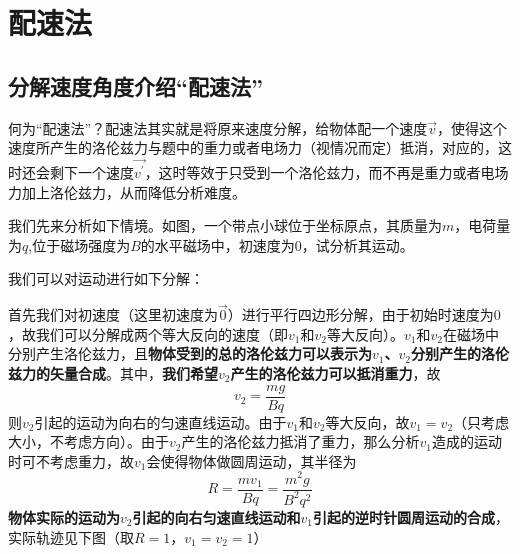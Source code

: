 \section{配速法}

\subsection{分解速度角度介绍“配速法”}

何为“配速法”？配速法其实就是将原来速度分解，给物体配一个速度$\vec{v}$，使得这个速度所产生的洛伦兹力与题中的重力或者电场力（视情况而定）抵消，对应的，这时还会剩下一个速度$\vec{v^{\prime}}$，这时等效于只受到一个洛伦兹力，而不再是重力或者电场力加上洛伦兹力，从而降低分析难度。



我们先来分析如下情境。如图，一个带点小球位于坐标原点，其质量为$m$，电荷量为$q$,位于磁场强度为$B$的水平磁场中，初速度为$0$，试分析其运动。

我们可以对运动进行如下分解：



首先我们对初速度（这里初速度为$\vec{0}$）进行平行四边形分解，由于初始时速度为$0$，故我们可以分解成两个等大反向的速度（即$v_1$和$v_2$等大反向）。$v_1$和$v_2$在磁场中分别产生洛伦兹力，且\textbf{物体受到的总的洛伦兹力可以表示为$v_1$、$v_2$分别产生的洛伦兹力的矢量合成}。其中，\textbf{我们希望$v_2$产生的洛伦兹力可以抵消重力}，故
$$v_2=\frac{mg}{Bq}$$
则$v_2$引起的运动为向右的匀速直线运动。由于$v_1$和$v_2$等大反向，故$v_1 = v_2$（只考虑大小，不考虑方向）。由于$v_2$产生的洛伦兹力抵消了重力，那么分析$v_1$造成的运动时可不考虑重力，故$v_1$会使得物体做圆周运动，其半径为
$$R = \frac{m v_1}{B q} = \frac{m^2 g}{B^2 q^2}$$
\textbf{物体实际的运动为$v_2$引起的向右匀速直线运动和$v_1$引起的逆时针圆周运动的合成}，实际轨迹见下图（取$R=1$，$v_1=v_2=1$）

